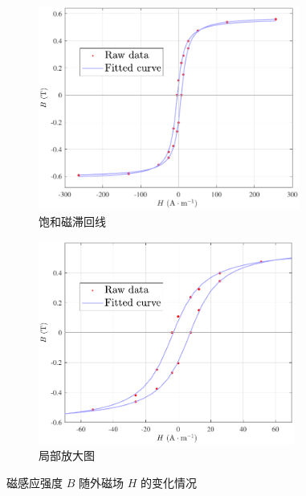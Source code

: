 \documentclass[UTF8]{article}
\theoremstyle{MyLineTheoremStyle} %
\theoremstyle{MyBlockTheoremStyle} %
\theoremstyle{MySubsubsectionStyle} %
\begin{document}
\begin{figure}[H]\centering
\begin{subfigure}[b]{0.5\columnwidth}\centering
    \includegraphics[height=190pt]{assets/1.1/(1)/2024-10-23_01-06-12.pdf}
    \caption{饱和磁滞回线}
\end{subfigure}\hfill
\begin{subfigure}[b]{0.5\columnwidth}\centering
    \includegraphics[height=190pt]{assets/1.1/(1)/2024-10-23_01-06-14.pdf}
    \caption{局部放大图}
\end{subfigure}
\caption{磁感应强度 $B$ 随外磁场 $H$ 的变化情况}
\label{1.1图}
\end{figure}
\end{document}
